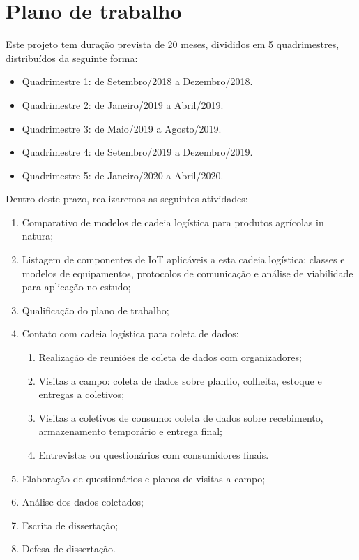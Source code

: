 \documentclass[
	12pt,				%
	openright,			%
	oneside,			%
	a4paper,			%
	english,			%
	french,				%
	spanish,			%
	brazil,				%
	]{abntex2}
\begin{document}
\chapter{Plano de trabalho}

Este projeto tem duração prevista de 20 meses, divididos em 5 quadrimestres, distribuídos da seguinte forma:

\begin{itemize}
\item Quadrimestre 1: de Setembro/2018 a Dezembro/2018.
\item Quadrimestre 2: de Janeiro/2019 a Abril/2019.
\item Quadrimestre 3: de Maio/2019 a Agosto/2019.
\item Quadrimestre 4: de Setembro/2019 a Dezembro/2019.
\item Quadrimestre 5: de Janeiro/2020 a Abril/2020.
\end{itemize}
Dentro deste prazo, realizaremos as seguintes atividades:

\begin{enumerate}
\item Comparativo de modelos de cadeia logística para produtos agrícolas in natura;

\item Listagem de componentes de IoT aplicáveis a esta cadeia logística: classes e modelos de equipamentos,  protocolos de comunicação e análise de viabilidade para aplicação no estudo;

\item Qualificação do plano de trabalho;

\item Contato com cadeia logística para coleta de dados: 
\begin{enumerate}
	\item Realização de reuniões de coleta de dados com organizadores;
	\item Visitas a campo: coleta de dados sobre plantio, colheita, estoque e entregas a coletivos;
	\item Visitas a coletivos de consumo: coleta de dados sobre recebimento, armazenamento temporário e entrega final;
	\item Entrevistas ou questionários com consumidores finais.
\end{enumerate}

\item Elaboração de questionários e planos de visitas a campo;

\item Análise dos dados coletados;

\item Escrita de dissertação;

\item Defesa de dissertação.
\end{enumerate}
\end{document}
